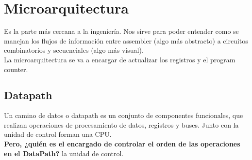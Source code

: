 \documentclass[10pt,a4paper]{article}
\begin{document}
\section*{Microarquitectura}
Es la parte más cercana a la ingeniería. Nos sirve para poder entender como se manejan los flujos de información entre assembler (algo más abstracto) a circuitos combinatorios y secuenciales (algo más visual). \\
La microarquitectura se va a encargar de actualizar los registros y el program counter. \\

\subsection*{Datapath}
Un camino de datos o datapath es un conjunto de componentes funcionales, que realizan operaciones de procesamiento de datos, registros y buses. Junto con la unidad de control forman una CPU. \\
\textbf{Pero, ¿quién es el encargado de controlar el orden de las operaciones en el DataPath?} la unidad de control. \\  
\end{document}

